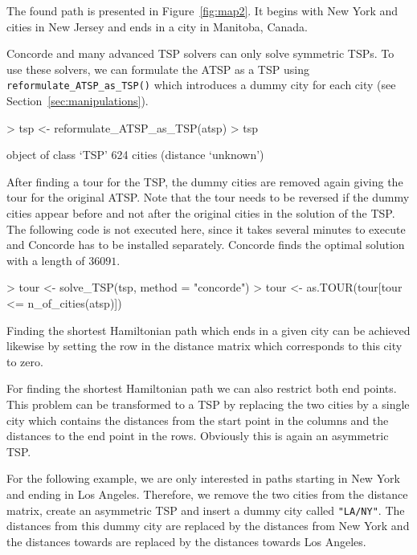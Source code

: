 \documentclass[10pt,a4paper,fleqn]{article}
\newcommand{\func}[1]{\mbox{\texttt{#1()}}}
\newcommand{\code}[1]{\mbox{\texttt{#1}}}
\begin{document}
The found path is presented in Figure~\ref{fig:map2}. It begins with New
York and cities in New Jersey and ends in a city in Manitoba, Canada.

Concorde and many advanced TSP solvers can only solve symmetric TSPs. To
use these solvers, we can formulate the ATSP as a TSP using
\func{reformulate\_ATSP\_as\_TSP} which introduces a dummy city for each
city (see Section~\ref{sec:manipulations}).

\begin{Schunk}
\begin{Sinput}
> tsp <- reformulate_ATSP_as_TSP(atsp)
> tsp
\end{Sinput}
\begin{Soutput}
object of class ‘TSP’ 
624 cities (distance ‘unknown’) 
\end{Soutput}
\end{Schunk}

After finding a tour for the TSP, the dummy cities are removed again giving the
tour for the original ATSP.  
Note that the tour needs to be reversed if the
dummy cities appear before and not after the original cities in the solution of
the TSP.  The following code is not executed here, since it takes several
minutes to execute and Concorde has to be installed separately.  Concorde finds
the optimal solution with a length of $36091$.


\begin{Schunk}
\begin{Sinput}
> tour <- solve_TSP(tsp, method = "concorde")
> tour <- as.TOUR(tour[tour <= n_of_cities(atsp)])
\end{Sinput}
\end{Schunk}


Finding the shortest Hamiltonian path which ends in a given city can be
achieved likewise by setting the row in the distance matrix which
corresponds to this city to zero.

For finding the shortest Hamiltonian path we can also restrict both end
points.  This problem can be transformed to a TSP by replacing the two
cities by a single city which contains the distances from the start
point in the columns and the distances to the end point in the
rows. Obviously this is again an asymmetric TSP.

For the following example, we are only interested in paths starting in
New York and ending in Los Angeles. Therefore, we remove the two cities
from the distance matrix, create an asymmetric TSP and insert a dummy
city called \code{"LA/NY"}. The distances from this dummy city are
replaced by the distances from New York and the distances towards are
replaced by the distances towards Los Angeles.
\end{document}
